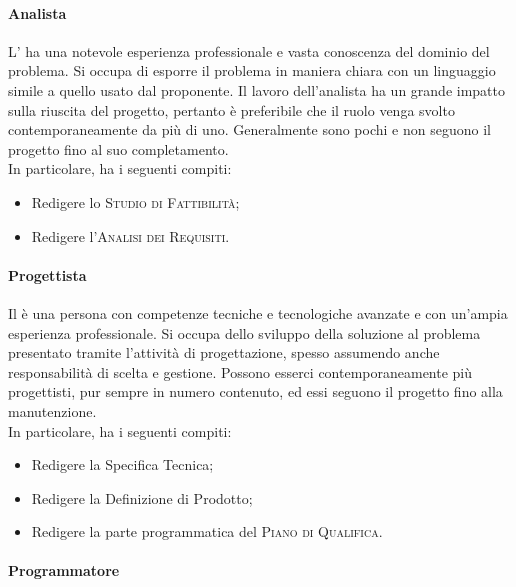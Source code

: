 \paragraph{Analista}

L'\textbf{} ha una notevole esperienza professionale e vasta conoscenza del dominio del problema. 
Si occupa di esporre il problema in maniera chiara con un linguaggio simile a quello usato dal proponente. Il lavoro 
dell'analista ha un grande impatto sulla riuscita del progetto, pertanto è preferibile che il ruolo venga svolto 
contemporaneamente da più di uno. 
Generalmente sono pochi e non seguono il progetto fino al suo completamento.\\
In particolare, ha i seguenti compiti:
\begin{itemize} 
    \item Redigere lo \textsc{Studio di Fattibilità};
    \item Redigere l'\textsc{Analisi dei Requisiti}.
\end{itemize}

\paragraph{Progettista}

Il \textbf{} è una persona con competenze tecniche e tecnologiche avanzate e con un'ampia 
esperienza professionale. Si occupa dello sviluppo della soluzione al problema presentato tramite l'attività di 
progettazione, spesso assumendo anche responsabilità di scelta e gestione. Possono esserci contemporaneamente più 
progettisti, pur sempre in numero contenuto, ed essi seguono il progetto fino alla manutenzione.\\
In particolare, ha i seguenti compiti:
\begin{itemize}
    \item Redigere la Specifica Tecnica;
    \item Redigere la Definizione di Prodotto;
    \item Redigere la parte programmatica del \textsc{Piano di Qualifica}.
\end{itemize}

\paragraph{Programmatore}

